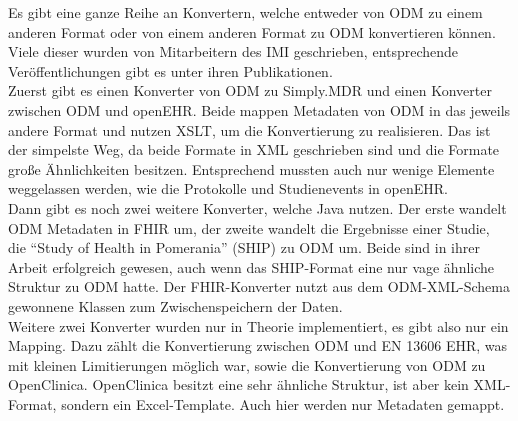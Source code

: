 



	




Es gibt eine ganze Reihe an Konvertern, welche entweder von ODM zu einem anderen Format oder von einem anderen Format zu ODM konvertieren können.
Viele dieser wurden von Mitarbeitern des IMI geschrieben, entsprechende Veröffentlichungen gibt es unter ihren Publikationen.\\

Zuerst gibt es einen Konverter von ODM zu Simply.MDR \cite{odm2mdr} und einen Konverter zwischen ODM und openEHR\cite{odm2openehr}.
Beide mappen Metadaten von ODM in das jeweils andere Format und nutzen XSLT, um die Konvertierung zu realisieren.
Das ist der simpelste Weg, da beide Formate in XML geschrieben sind und die Formate große Ähnlichkeiten besitzen.
Entsprechend mussten auch nur wenige Elemente weggelassen werden, wie die Protokolle und Studienevents in openEHR.\\

Dann gibt es noch zwei weitere Konverter, welche Java nutzen. Der erste wandelt ODM Metadaten in FHIR \cite{odm2fhir} um, der zweite wandelt die Ergebnisse einer Studie, die \enquote{Study of Health in Pomerania} (SHIP) zu ODM um\cite{ship2odm}.
Beide sind in ihrer Arbeit erfolgreich gewesen, auch wenn das SHIP-Format eine nur vage ähnliche Struktur zu ODM hatte.
Der FHIR-Konverter nutzt aus dem ODM-XML-Schema gewonnene Klassen zum Zwischenspeichern der Daten.\\

Weitere zwei Konverter wurden nur in Theorie implementiert, es gibt also nur ein Mapping.
Dazu zählt die Konvertierung zwischen ODM und EN 13606 EHR\cite{odm2ehr}, was mit kleinen Limitierungen möglich war, sowie die Konvertierung von ODM zu OpenClinica\cite{odm2oc}.
OpenClinica besitzt eine sehr ähnliche Struktur, ist aber kein XML-Format, sondern ein Excel-Template.
Auch hier werden nur Metadaten gemappt.\\

